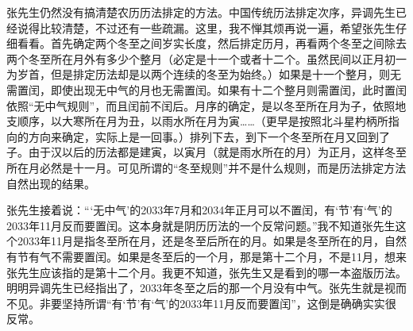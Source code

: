 张先生仍然没有搞清楚农历历法排定的方法。中国传统历法排定次序，异调先生已经说得比较清楚，不过还有一些疏漏。这里，我不惮其烦再说一遍，希望张先生仔细看看。首先确定两个冬至之间岁实长度，然后排定历月，再看两个冬至之间除去两个冬至所在月外有多少个整月（必定是十一个或者十二个。虽然民间以正月初一为岁首，但是排定历法却是以两个连续的冬至为始终。）如果是十一个整月，则无需置闰，即使出现无中气的月也无需置闰。如果有十二个整月则需置闰，此时置闰依照“无中气规则”，而且闰前不闰后。月序的确定，是以冬至所在月为子，依照地支顺序，以大寒所在月为丑，以雨水所在月为寅……（更早是按照北斗星杓柄所指向的方向来确定，实际上是一回事。）排列下去，到下一个冬至所在月又回到了子。由于汉以后的历法都是建寅，以寅月（就是雨水所在的月）为正月，这样冬至所在月必然是十一月。可见所谓的“冬至规则”并不是什么规则，而是历法排定方法自然出现的结果。

张先生接着说：“‘无中气’的2033年7月和2034年正月可以不置闰，有‘节’有‘气’的2033年11月反而要置闰。这本身就是阴历历法的一个反常问题。”我不知道张先生这个2033年11月是指冬至所在月，还是冬至后所在的月。如果是冬至所在的月，自然有节有气不需要置闰。如果是冬至后的一个月，那是第十二个月，不是11月，想来张先生应该指的是第十二个月。我更不知道，张先生又是看到的哪一本盗版历法。明明异调先生已经指出了，2033年冬至之后的那一个月没有中气。张先生就是视而不见。非要坚持所谓“有‘节’有‘气’的2033年11月反而要置闰”，这倒是确确实实很反常。